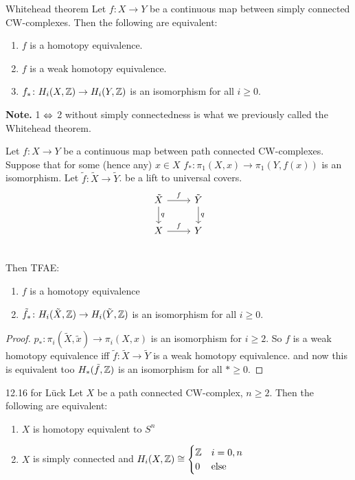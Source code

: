 \documentclass[language=english]{TemplateLecture}
\begin{document}
\begin{thm}{Whitehead theorem}{}
    Let \(f\colon X\to Y\) be a continuous map between simply connected CW-complexes. Then the following are equivalent:
    \begin{enumerate}
        \item \(f\) is a homotopy equivalence.
        \item \(f\) is a weak homotopy equivalence.
        \item \(f_*\colon H_i(X,\mathbb{Z})\to H_i(Y, \mathbb{Z})\) is an isomorphism for all \(i\geq 0\).
    \end{enumerate}
\end{thm}

\textbf{Note.} 1 \(\Leftrightarrow\) 2 without simply connectedness is what we previously called the Whitehead theorem.

\begin{thm}{}{}
    Let \(f\colon X\to Y\) be a continuous map between path connected CW-complexes. Suppose that for some (hence any) \(x \in X\) \(f_*\colon \pi_1(X,x) \to \pi_1(Y, f(x))\) is an isomorphism. Let \(\tilde f\colon \tilde X\to \tilde Y\). be a lift to universal covers.
    \[\begin{tikzcd}
        \tilde X \ar[r, "f"]\ar[d, "q"] & \tilde Y \ar[d, "q"] \\
        X\ar[r, "f"] & Y \\
    \end{tikzcd}\]
    Then TFAE:
    \begin{enumerate}
        \item \(f\) is a homotopy equivalence
        \item \(\tilde f_*\colon H_i(\tilde X, \mathbb{Z}) \to H_i(\tilde Y, \mathbb{Z})\) is an isomorphism for all \(i \geq 0\).
    \end{enumerate}
\end{thm}

\begin{proof}
    \(p_*\colon \pi_i(\tilde X, \tilde x)\to \pi_i(X,x)\) is an isomorphism for \(i\geq 2\). So  \(f\) is a weak homotopy equivalence iff \(\tilde f\colon \tilde X\to \tilde Y\) is a weak homotopy equivalence. and now this is equivalent too \(H_*(\tilde f, \mathbb{Z}) \) is an isomorphism for all \(*\geq 0\).
\end{proof}

\begin{thm}{12.16 for Lück}{}
    Let \(X\) be a path connected CW-complex, \(n\geq 2\). Then the following are equivalent:
    \begin{enumerate}
        \item \(X\) is homotopy equivalent to \(S^n\)
        \item \(X\) is simply connected and \(H_i(X,\mathbb{Z})\cong \begin{cases}
            \mathbb{Z} & i = 0,n\\
            0 & \text{else}
        \end{cases}\)
    \end{enumerate}
\end{thm}
\end{document}
